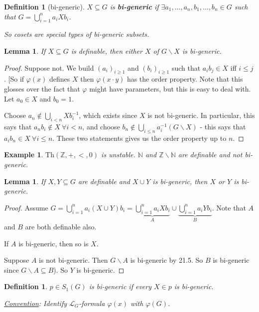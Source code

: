 \documentclass[]{article}
\theoremstyle{custhm}
\theoremstyle{cusdef}
\newtheorem{defin}[theorem]{Definition}
\theoremstyle{custhm}
\newtheorem{lemma}[theorem]{Lemma}
\theoremstyle{custhm}
\theoremstyle{custhm}
\theoremstyle{ex}
\newtheorem{ex}[theorem]{Example}
\theoremstyle{custhm}
\theoremstyle{cusdef}
\theoremstyle{remark}
\theoremstyle{remark}
\theoremstyle{numremark}
\newcommand{\Z}{\mathbb{Z}}
\newcommand{\undf}[1]{\textit{\textbf{#1}}}
\renewcommand{\L}{\mathcal{L}}
\renewcommand{\phi}{\varphi}
\newcommand{\Th}{\textrm{Th}}
\begin{document}
\begin{defin}[bi-generic]
	$X\subseteq G$ is \undf{bi-generic} if $\exists a_1,\dots,a_n,b_1,\dots,b_n\in G$ such that $G = \bigcup_{i=1}^{n}a_iXb_i$.

	So cosets are special types of bi-generic subsets.
\end{defin}

\begin{lemma}
	If $X\subseteq G$ is definable, then either $X$ of $G\backslash X$ is bi-generic.
\end{lemma}
\begin{proof}
	Suppose not. We build $(a_i)_{i\ge 1}$ and $(b_i)_{i\ge 1}$ such that $a_ib_j \in X$ iff $i \le j$. [So if $\phi(x)$ defines $X$ then $\phi(x\cdot y)$ has the order property. Note that this glosses over the fact that $\phi$ might have parameters, but this is easy to deal with. Let $a_0 \in X$ and $b_0 = 1$.
	
	Choose $a_n \not \in \bigcup_{i<n} Xb_i^{-1}$, which exists since $X$ is not bi-generic. In particular, this says that $a_nb_i\not\in X\ \forall i<n$, and choose $b_n\not\in \bigcup_{i\le n}a_i^{-1}(G\backslash X)$ - this says that $a_ib_n\in X\ \forall i \le n$. These two statements gives us the order property up to $n$.
\end{proof}

\begin{ex}
	$\Th(\Z,+,<,0)$ is unstable. $\mathbb{N}$ and $\Z\backslash \mathbb{N}$ are definable and not bi-generic.
\end{ex}

\begin{lemma}
	If $X,Y\subseteq G$ are definable and $X\cup Y$ is bi-generic, then $X$ or $Y$ is bi-generic.
\end{lemma}
\begin{proof}
	Assume $G = \bigcup_{i = 1}^{n}a_i(X\cup Y)b_i = \underbrace{\bigcup_{i=1}^{n}a_iXb_i}_{A}\cup\underbrace{\bigcup_{i=1}^{n}a_iYb_i}_B$. Note that $A$ and $B$ are both definable also.

	If $A$ is bi-generic, then so is $X$.

	Suppose $A$ is not bi-generic. Then $G\backslash A$ is bi-generic by 21.5. So $B$ is bi-generic since $G\backslash A \subseteq B$). So $Y$ is bi-generic.
\end{proof}

\begin{defin}
	$p \in S_1(G)$ is bi-generic if every $X \in p$ is bi-generic.

	\underline{Convention}: Identify $\L_G$-formula $\phi(x)$ with $\phi(G)$.
\end{defin}
\end{document}
